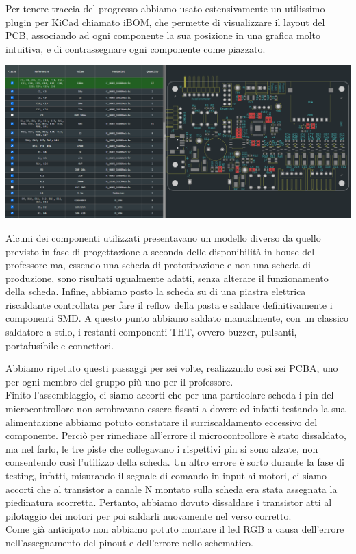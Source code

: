\noindent Per tenere traccia del progresso abbiamo usato estensivamente un utilissimo plugin per KiCad chiamato iBOM, che permette di visualizzare il layout del PCB, associando ad ogni componente la sua posizione in una grafica molto intuitiva, e di contrassegnare ogni componente come piazzato.

\begin{center}
    \includegraphics[width=\textwidth]{figures/image108.png}
    \captionsetup{type=figure}
\end{center}

\noindent Alcuni dei componenti utilizzati presentavano un modello diverso da quello previsto in fase di progettazione a seconda delle disponibilità in-house del professore ma, essendo una scheda di prototipazione e non una scheda di produzione, sono risultati ugualmente adatti, senza alterare il funzionamento della scheda. Infine, abbiamo posto la scheda su di una piastra elettrica riscaldante controllata per fare il reflow della pasta e saldare definitivamente i componenti SMD. A questo punto abbiamo saldato manualmente, con un classico saldatore a stilo, i restanti componenti THT, ovvero buzzer, pulsanti, portafusibile e connettori.

\noindent Abbiamo ripetuto questi passaggi per sei volte, realizzando così sei PCBA, uno per ogni membro del gruppo più uno per il professore.\\
Finito l’assemblaggio, ci siamo accorti che per una particolare scheda i pin del microcontrollore non sembravano 
essere fissati a dovere ed infatti testando la sua alimentazione abbiamo potuto constatare il surriscaldamento eccessivo 
del componente. Perciò per rimediare all’errore il microcontrollore è stato dissaldato, ma nel farlo, le tre piste che collegavano 
i rispettivi pin si sono alzate, non consentendo così l’utilizzo della scheda. Un altro errore è sorto durante la fase di testing, 
infatti, misurando il segnale di comando in input ai motori, ci siamo accorti che al transistor a canale N montato sulla scheda era 
stata assegnata la piedinatura scorretta. Pertanto, abbiamo dovuto dissaldare i transistor atti al pilotaggio dei motori per poi 
saldarli nuovamente nel verso corretto.\\
Come già anticipato non abbiamo potuto montare il led RGB a causa dell'errore nell'assegnamento del pinout e dell'errore nello schematico.